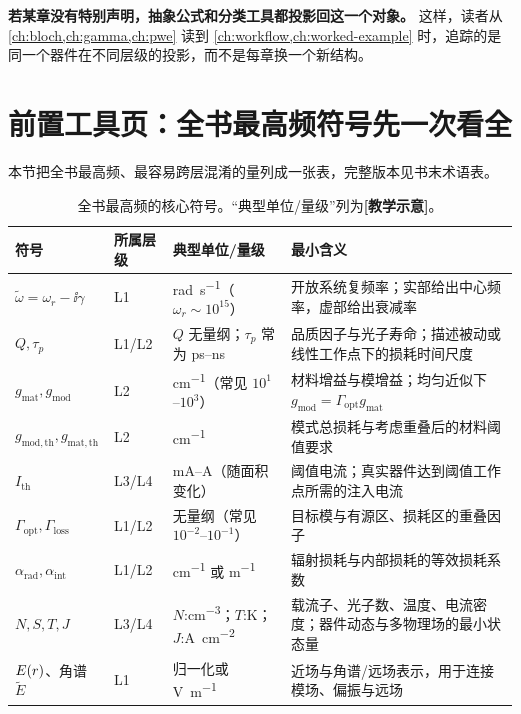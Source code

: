 \textbf{若某章没有特别声明，抽象公式和分类工具都投影回这一个对象。} 这样，读者从 \cref{ch:bloch,ch:gamma,ch:pwe} 读到 \cref{ch:workflow,ch:worked-example} 时，追踪的是同一个器件在不同层级的投影，而不是每章换一个新结构。

\section{前置工具页：全书最高频符号先一次看全}
本节把全书最高频、最容易跨层混淆的量列成一张表，完整版本见书末术语表。

\begin{table}[htbp]
  \centering
  \scriptsize
  \caption{全书最高频的核心符号。“典型单位/量级”列为\textbf{[教学示意]}。}
  \label{tab:core_symbols_toolpage}
  \setlength{\tabcolsep}{3pt}
  \begin{tabularx}{\textwidth}{@{}p{2.25cm}p{1.55cm}p{2.25cm}Y@{}}
    \toprule
    符号 & 所属层级 & 典型单位/量级 & 最小含义 \\
    \midrule
    $\tilde{\omega}=\omega_r-\ii\gamma$ & L1 & \si{rad.s^{-1}}（$\omega_r\sim10^{15}$） & 开放系统复频率；实部给出中心频率，虚部给出衰减率 \\
    $Q,\tau_p$ & L1/L2 & $Q$ 无量纲；$\tau_p$ 常为 ps--ns & 品质因子与光子寿命；描述被动或线性工作点下的损耗时间尺度 \\
    $g_{\mathrm{mat}},g_{\mathrm{mod}}$ & L2 & \si{cm^{-1}}（常见 $10^1$--$10^3$） & 材料增益与模增益；均匀近似下 $g_{\mathrm{mod}}=\Gamma_{\mathrm{opt}}g_{\mathrm{mat}}$ \\
    $g_{\mathrm{mod,th}},g_{\mathrm{mat,th}}$ & L2 & \si{cm^{-1}} & 模式总损耗与考虑重叠后的材料阈值要求 \\
    $I_{\mathrm{th}}$ & L3/L4 & \si{mA}--\si{A}（随面积变化） & 阈值电流；真实器件达到阈值工作点所需的注入电流 \\
    $\Gamma_{\mathrm{opt}},\Gamma_{\mathrm{loss}}$ & L1/L2 & 无量纲（常见 $10^{-2}$--$10^{-1}$） & 目标模与有源区、损耗区的重叠因子 \\
    $\alpha_{\mathrm{rad}},\alpha_{\mathrm{int}}$ & L1/L2 & \si{cm^{-1}} 或 \si{m^{-1}} & 辐射损耗与内部损耗的等效损耗系数 \\
    $N,S,T,J$ & L3/L4 & $N$:\si{cm^{-3}}；$T$:\si{K}；$J$:\si{A.cm^{-2}} & 载流子、光子数、温度、电流密度；器件动态与多物理场的最小状态量 \\
    $E(r)$、角谱 $\tilde{E}$ & L1 & 归一化或 \si{V.m^{-1}} & 近场与角谱/远场表示，用于连接模场、偏振与远场 \\
    \bottomrule
  \end{tabularx}
\end{table}

